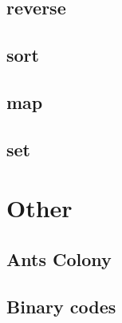         \subsection{reverse}
                
        \subsection{sort}
                
        \subsection{map}
                
        \subsection{set}
                

\section{Other}
        \subsection{Ants Colony}
                
        \subsection{Binary codes}        
                
